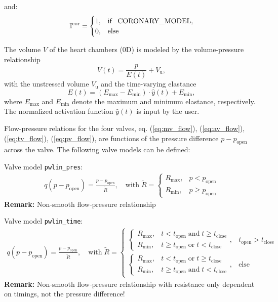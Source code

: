 \documentclass[a4paper,12pt]{report}
\begin{document}
and:
\begin{align}
\mathbb{I}^{\mathrm{cor}} = \begin{cases} 1, & \text{if \, CORONARY\_MODEL}, \\ 0, & \text{else} \end{cases}\nonumber
\end{align}

The volume $V$ of the heart chambers (0D) is modeled by the volume-pressure relationship
\begin{equation}
V(t) = \frac{p}{E(t)} + V_{\mathrm{u}},
\end{equation}
with the unstressed volume $V_{\mathrm{u}}$ and the time-varying elastance
\begin{equation}
E(t)=\left(E_{\mathrm{max}}-E_{\mathrm{min}}\right)\cdot \hat{y}(t)+E_{\mathrm{min}} \label{at_elast},
\end{equation}
where $E_{\mathrm{max}}$ and $E_{\mathrm{min}}$ denote the maximum and minimum elastance, respectively. The normalized activation function $\hat{y}(t)$ is input by the user.

Flow-pressure relations for the four valves, eq. (\ref{eq:mv_flow}), (\ref{eq:av_flow}), (\ref{eq:tv_flow}), (\ref{eq:pv_flow}), are functions of the pressure difference $p-p_{\mathrm{open}}$ across the valve. The following valve models can be defined:

Valve model \verb.pwlin_pres.:
\begin{align}
q(p-p_{\mathrm{open}}) = \frac{p-p_{\mathrm{open}}}{\tilde{R}}, \quad \text{with}\; \tilde{R} = \begin{cases} R_{\max}, & p < p_{\mathrm{open}} \\
R_{\min}, & p \geq p_{\mathrm{open}} \end{cases}\nonumber
\end{align}
\textbf{Remark:} Non-smooth flow-pressure relationship

Valve model \verb.pwlin_time.:
\begin{align}
q(p-p_{\mathrm{open}}) = \frac{p-p_{\mathrm{open}}}{\tilde{R}},\quad \text{with}\; \tilde{R} = \begin{cases} \begin{cases} R_{\max}, & t < t_{\mathrm{open}} \;\text{and}\; t \geq t_{\mathrm{close}} \\
R_{\min}, & t \geq t_{\mathrm{open}} \;\text{or}\; t < t_{\mathrm{close}} \end{cases}, & t_{\mathrm{open}} > t_{\mathrm{close}} \\ \begin{cases} R_{\max}, & t < t_{\mathrm{open}} \;\text{or}\; t \geq t_{\mathrm{close}} \\
R_{\min}, & t \geq t_{\mathrm{open}} \;\text{and}\; t < t_{\mathrm{close}} \end{cases}, & \text{else} \end{cases}\nonumber
\end{align}
\textbf{Remark:} Non-smooth flow-pressure relationship with resistance only dependent on timings, not the pressure difference!
\end{document}

